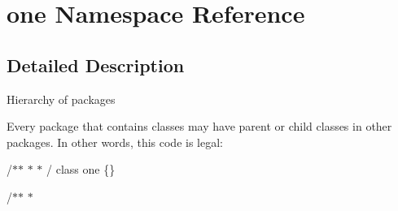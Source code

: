 \hypertarget{namespaceone}{\section{one \-Namespace \-Reference}
\label{namespaceone}
}


\subsection{\-Detailed \-Description}
\-Hierarchy of packages

\-Every package that contains classes may have parent or child classes in other packages. \-In other words, this code is legal\-:

{\ttfamily  /$\ast$$\ast$ $\ast$ $\ast$ / class one \{\}}

{\ttfamily  /$\ast$$\ast$ $\ast$ }